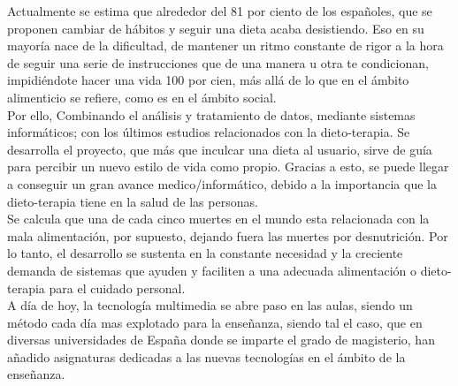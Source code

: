 
Actualmente se estima que alrededor del 81 por ciento de los españoles, que se proponen cambiar de hábitos y seguir una dieta acaba desistiendo. Eso en su mayoría nace de la dificultad, de mantener un ritmo constante de rigor a la hora de seguir una serie de instrucciones que de una manera u otra te condicionan, impidiéndote hacer una vida 100 por cien, más allá de lo que en el ámbito alimenticio se refiere, como es en el ámbito social. \\

Por ello, Combinando el análisis y tratamiento de datos, mediante sistemas informáticos; con los últimos estudios relacionados con la dieto-terapia. Se desarrolla el proyecto, que más que inculcar una dieta al usuario, sirve de guía para percibir un nuevo estilo de vida como propio. Gracias a esto, se puede llegar a conseguir un gran avance medico/informático, debido a la importancia que la dieto-terapia tiene en la salud de las personas. \\

Se calcula que una de cada cinco muertes en el mundo esta relacionada con la mala alimentación, por supuesto, dejando fuera las muertes por desnutrición. Por lo tanto, el desarrollo se sustenta en la constante necesidad y la creciente demanda de sistemas que ayuden y faciliten a una adecuada alimentación o dieto-terapia para el cuidado personal.\\

A día de hoy, la tecnología multimedia se abre paso en las aulas, siendo un método cada día mas explotado para la enseñanza, siendo tal el caso, que en diversas universidades de España donde se imparte el grado de magisterio, han añadido asignaturas dedicadas a las nuevas tecnologías en el ámbito de la enseñanza. \cite{multimedia} \\

